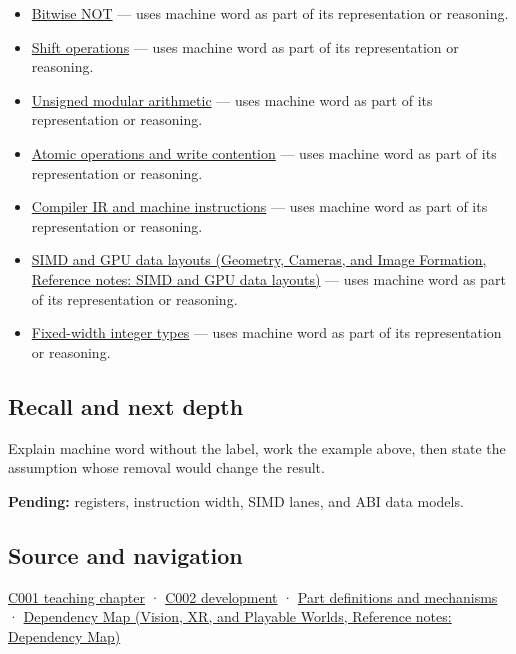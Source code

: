 \begin{itemize}
\tightlist
\item
  \hyperref[appendix-8f38927cfc54]{Bitwise NOT} --- uses machine word as part of its representation or reasoning.
\item
  \hyperref[appendix-73425b25118e]{Shift operations} --- uses machine word as part of its representation or reasoning.
\item
  \hyperref[appendix-c99977d88b33]{Unsigned modular arithmetic} --- uses machine word as part of its representation or reasoning.
\item
  \hyperref[appendix-e12d1b03fefb]{Atomic operations and write contention} --- uses machine word as part of its representation or reasoning.
\item
  \hyperref[appendix-942ad41afb30]{Compiler IR and machine instructions} --- uses machine word as part of its representation or reasoning.
\item
  \href{../03-Geometry-Cameras-and-Image-Formation/main.pdf\#nameddest=appendix-3c7b1a56de01}{SIMD and GPU data layouts (Geometry, Cameras, and Image Formation, Reference notes: SIMD and GPU data layouts)} --- uses machine word as part of its representation or reasoning.
\item
  \hyperref[appendix-cc04044b5782]{Fixed-width integer types} --- uses machine word as part of its representation or reasoning.
\end{itemize}

\subsection{Recall and next depth}\label{appendix-d67a19507dc5-recall-and-next-depth}

Explain machine word without the label, work the example above, then state the assumption whose removal would change the result.

\textbf{Pending:} registers, instruction width, SIMD lanes, and ABI data models.

\subsection{Source and navigation}\label{appendix-d67a19507dc5-source-and-navigation}

\hyperref[01-foundations-i-ch001-from-a-signal-to-an-interpretation]{C001 teaching chapter} · \hyperref[01-foundations-i-ch001-arithmetic-becomes-a-policy]{C002 development} · \hyperref[appendix-fd090d982a15]{Part definitions and mechanisms} · \href{../07-Vision-XR-and-Playable-Worlds/main.pdf\#nameddest=appendix-4ad47bdd269a}{Dependency Map (Vision, XR, and Playable Worlds, Reference notes: Dependency Map)}
